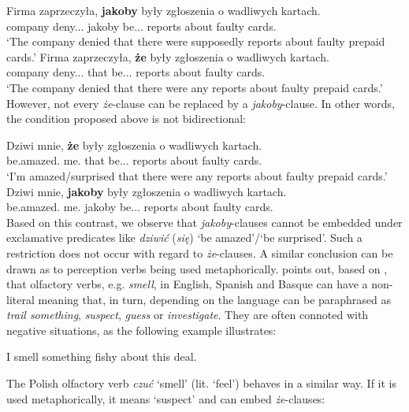\documentclass[output=paper
,modfonts
,nonflat]{langsci/langscibook}
\begin{document}
\ea \ea \gll		Firma zaprzeczyła, \textbf{jakoby} były zgłoszenia o wadliwych kartach. \label{kaffeec} \\
			company deny.{\lptcp}.{\sg}.{\fem} jakoby be.{\lptcp}.{\nvir}.{\pl} reports about faulty cards.{\loc} \\
	\glt	`The company denied that there were supposedly reports about faulty prepaid cards.'  
	\ex\gll			Firma zaprzeczyła, \textbf{że} były zgłoszenia o wadliwych kartach. \\
			company deny.{\lptcp}.{\sg}.{\fem} that be.{\lptcp}.{\nvir}.{\pl} reports about faulty cards.{\loc} \\
	\glt	`The company denied that there were any reports about faulty prepaid cards.'
\z\z
However, not every \emph{że}-clause can be replaced by a \emph{jakoby}-clause. In other words, the condition proposed above is not bidirectional:

\ea \ea \gll		Dziwi mnie, \textbf{że} były zgłoszenia o wadliwych kartach. \\
			be.amazed.{\thirdperson}{\sg} me.{\acc} that be.{\lptcp}.{\nvir}.{\pl} reports about faulty cards.{\loc} \\
	\glt		 `I'm amazed/surprised that there were any reports about faulty prepaid cards.'
	\ex\gll		 *Dziwi mnie, \textbf{jakoby} były zgłoszenia o wadliwych kartach. \\
			be.amazed.{\thirdperson}{\sg} me.{\acc} jakoby be.{\lptcp}.{\nvir}.{\pl} reports about faulty cards.{\loc} \\ 
\z\z
Based on this contrast, we observe that \emph{jakoby}-clauses cannot be embedded under exclamative predicates like \emph{dziwić} (\emph{się})  `be amazed'\slash `be surprised'. Such a restriction does not occur with regard to  \emph{że}-clauses. A similar conclusion can be drawn as to perception verbs being used metaphorically. \textcite{Ibarretxe-Antunano1999} points out, based on \textcite{Sweetser1990}, that olfactory verbs, e.g. \emph{smell}, in English, Spanish and Basque can have a non-literal meaning that, in turn, depending on the language can be paraphrased as \emph{trail something}, \emph{suspect}, \emph{guess} or \emph{investigate}. They are often connoted with negative situations, as the following example illustrates: 

\ea I smell something fishy about this deal.  \z

The Polish olfactory verb \emph{czuć} `smell' (lit. `feel') behaves in a similar way. If it is used metaphorically, it means `suspect' and can embed \emph{że}-clauses: 
\end{document}
